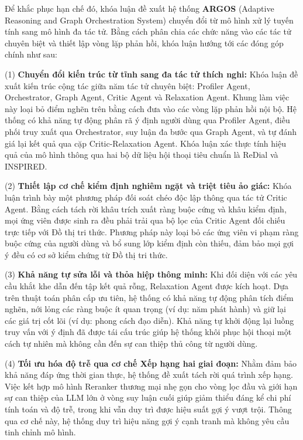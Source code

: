 Để khắc phục hạn chế đó, khóa luận đề xuất hệ thống \textbf{ARGOS} (Adaptive Reasoning and Graph Orchestration System) chuyển đổi từ mô hình xử lý tuyến tính sang mô hình đa tác tử. Bằng cách phân chia các chức năng vào các tác tử chuyên biệt và thiết lập vòng lặp phản hồi, khóa luận hướng tới các đóng góp chính như sau:

(1) \textbf{Chuyển đổi kiến trúc từ tĩnh sang đa tác tử thích nghi:} Khóa luận đề xuất kiến trúc cộng tác giữa năm tác tử chuyên biệt: Profiler Agent, Orchestrator, Graph Agent, Critic Agent và Relaxation Agent. Khung làm việc này loại bỏ điểm nghẽn trên bằng cách đưa vào các vòng lặp phản hồi nội bộ. Hệ thống có khả năng tự động phân rã ý định người dùng qua Profiler Agent, điều phối truy xuất qua Orchestrator, suy luận đa bước qua Graph Agent, và tự đánh giá lại kết quả qua cặp Critic-Relaxation Agent. Khóa luận xác thực tính hiệu quả của mô hình thông qua hai bộ dữ liệu hội thoại tiêu chuẩn là ReDial và INSPIRED.

(2) \textbf{Thiết lập cơ chế kiểm định nghiêm ngặt và triệt tiêu ảo giác:} Khóa luận trình bày một phương pháp đối soát chéo độc lập thông qua tác tử Critic Agent. Bằng cách tách rời khâu trích xuất ràng buộc cứng và khâu kiểm định, mọi ứng viên được sinh ra đều phải trải qua bộ lọc của Critic Agent đối chiếu trực tiếp với Đồ thị tri thức. Phương pháp này loại bỏ các ứng viên vi phạm ràng buộc cứng của người dùng và bổ sung lớp kiểm định còn thiếu, đảm bảo mọi gợi ý đều có cơ sở kiểm chứng từ Đồ thị tri thức.

(3) \textbf{Khả năng tự sửa lỗi và thỏa hiệp thông minh:} Khi đối diện với các yêu cầu khắt khe dẫn đến tập kết quả rỗng, Relaxation Agent được kích hoạt. Dựa trên thuật toán phân cấp ưu tiên, hệ thống có khả năng tự động phân tích điểm nghẽn, nới lỏng các ràng buộc ít quan trọng (ví dụ: năm phát hành) và giữ lại các giá trị cốt lõi (ví dụ: phong cách đạo diễn). Khả năng tự khởi động lại luồng truy vấn với ý định đã được tái cấu trúc giúp hệ thống khôi phục hội thoại một cách tự nhiên mà không cần đến sự can thiệp thủ công từ người dùng.

(4) \textbf{Tối ưu hóa độ trễ qua cơ chế Xếp hạng hai giai đoạn:} Nhằm đảm bảo khả năng đáp ứng thời gian thực, hệ thống đề xuất tách rời quá trình xếp hạng. Việc kết hợp mô hình Reranker thương mại nhẹ gọn cho vòng lọc đầu và giới hạn sự can thiệp của LLM lớn ở vòng suy luận cuối giúp giảm thiểu đáng kể chi phí tính toán và độ trễ, trong khi vẫn duy trì được hiệu suất gợi ý vượt trội. Thông qua cơ chế này, hệ thống duy trì hiệu năng gợi ý cạnh tranh mà không yêu cầu tinh chỉnh mô hình.

